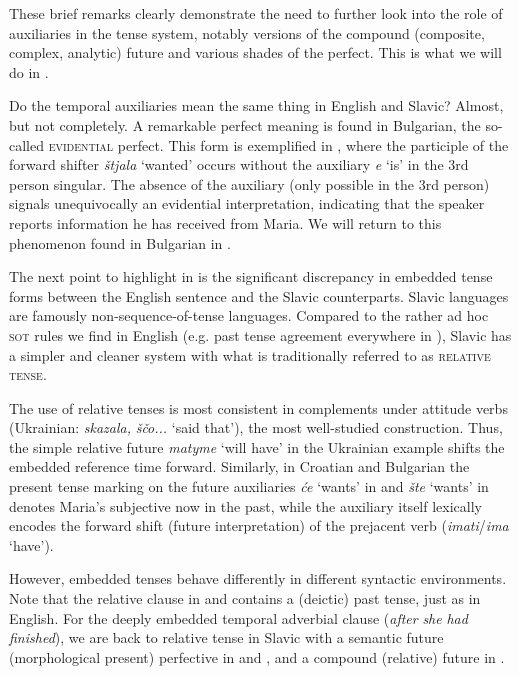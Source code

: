 \documentclass[output=paper,colorlinks,citecolor=brown]{langscibook}
\begin{document}
These brief remarks clearly demonstrate the need to further look into the role of auxiliaries in the tense system, notably versions of the compound (composite, complex, analytic) future and various shades of the perfect. This is what we will do in .

Do the temporal auxiliaries mean the same thing in English and Slavic? Almost, but not completely.  A remarkable perfect meaning is found in Bulgarian, the so-called \textsc{evidential} perfect. This form is exemplified in , where the participle of the forward shifter \textit{štjala} `wanted' occurs without the auxiliary \textit{e} `is' in the 3rd person singular. The absence of the auxiliary (only possible in the 3rd person) signals unequivocally an evidential interpretation, indicating that the speaker reports information he has received from Maria. We will return to this phenomenon found in Bulgarian in .

The next  point to highlight in  is the significant discrepancy in embedded tense forms between the English sentence and the Slavic counterparts. 
Slavic languages are famously non-sequence-of-tense languages. Compared to the rather ad hoc \textsc{sot} rules we find in English (e.g. past tense agreement everywhere in ), Slavic has a simpler and cleaner system with what is traditionally referred to as \textsc{relative tense}.


The use of relative tenses is most consistent in complements under attitude verbs (Ukrainian: \textit{skazala,} \textit{ščo...} `said that'), the most well-studied construction. Thus, the simple relative future \textit{matyme} `will have' in the Ukrainian example  shifts the embedded reference time forward.  Similarly, in Croatian and Bulgarian the present tense marking on the future auxiliaries  \textit{će} `wants' in   and \textit{šte} `wants' in  denotes Maria's subjective now in the past, while the auxiliary itself lexically encodes the forward shift (future interpretation) of the prejacent verb (\textit{imati}/\textit{ima} `have'). 

However, embedded tenses behave differently in different syntactic environments. Note that the relative clause in  and  contains a (deictic) past tense, just as in English. For the deeply embedded temporal adverbial clause (\textit{after} \textit{she} \textit{had} \textit{finished}), we are back to relative tense in Slavic with a semantic future (morphological present) perfective in  and , and a compound (relative) future in .
\end{document}
